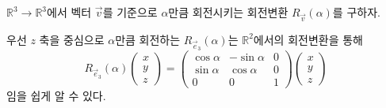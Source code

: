 \documentclass[sections/engineering_mathematics_lecture_note.tex]{subfiles}
\begin{document}
\begin{remark}
    $\mathbb R^3 \rightarrow \mathbb R^3$에서 벡터 $\vec v$를 기준으로 $\alpha$만큼 회전시키는 회전변환 $R_{\vec v}(\alpha)$를 구하자.

    우선 $z$ 축을 중심으로 $\alpha$만큼 회전하는 $R_{\vec e_3}(\alpha)$는 $\mathbb R^2$에서의 회전변환을 통해
    \begin{equation*}
        R_{\vec e_3}(\alpha)
        \begin{pmatrix}
            x \\ y \\ z
        \end{pmatrix}
        =
        \begin{pmatrix}
            \cos \alpha & -\sin \alpha & 0\\
            \sin \alpha & \cos \alpha & 0\\
            0 & 0 & 1
        \end{pmatrix}
        \begin{pmatrix}
            x \\ y \\ z
        \end{pmatrix}
    \end{equation*}
    임을 쉽게 알 수 있다.


\end{remark}
\end{document}
